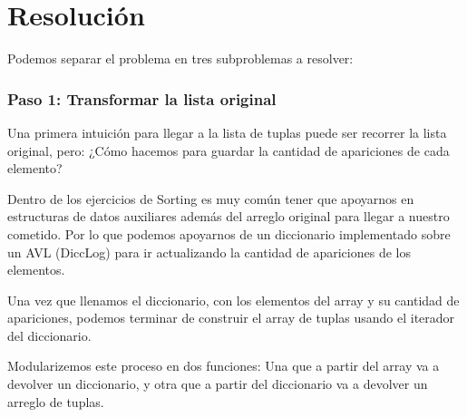 \documentclass{article}
\begin{document}
\section*{Resolución}
Podemos separar el problema en tres subproblemas a resolver:
\subsubsection*{Paso 1: Transformar la lista original}
Una primera intuición para llegar a la lista de tuplas puede ser recorrer la lista original, pero: ¿Cómo hacemos para guardar la cantidad de apariciones de cada elemento?

Dentro de los ejercicios de Sorting es muy común tener que apoyarnos en estructuras de datos auxiliares además del arreglo original para llegar a nuestro cometido. Por lo que podemos apoyarnos de un diccionario implementado sobre un AVL (DiccLog) para ir actualizando la cantidad de apariciones de los elementos. 

Una vez que llenamos el diccionario, con los elementos del array y su cantidad de apariciones, podemos terminar de construir el array de tuplas usando el iterador del diccionario.


Modularizemos este proceso en dos funciones: Una que a partir del array va a devolver un diccionario, y otra que a partir del diccionario va a devolver un arreglo de tuplas. 
\end{document}
